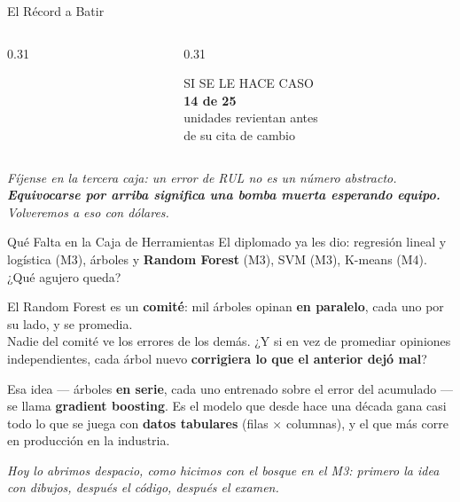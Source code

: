 \documentclass[aspectratio=169, 11pt]{beamer}
\begin{document}
\begin{frame}[shrink=8]{El Récord a Batir}
\begin{columns}[T]
\begin{column}{0.31\textwidth}
    \end{column}
    \begin{column}{0.31\textwidth}
      \begin{tcolorbox}[colback=arcaGray, colframe=codeBlue, boxrule=0pt, leftrule=3pt,
        arc=3pt, left=6pt, right=6pt, top=6pt, bottom=6pt]
        \centering
        {\scriptsize\color{textMuted}SI SE LE HACE CASO}\\[4pt]
        {\LARGE\color{codeBlue}\bfseries 14 de 25}\\[4pt]
        {\scriptsize\color{textMuted}unidades revientan antes\\de su cita de cambio}
      \end{tcolorbox}
    \end{column}
  \end{columns}
  \vspace{10pt}
  {\footnotesize\color{arcaDark}\itshape
   Fíjense en la tercera caja: un error de RUL no es un número
   abstracto. \textbf{Equivocarse por arriba significa una bomba muerta
   esperando equipo.} Volveremos a eso con dólares.}
\end{frame}

\begin{frame}[shrink=16]{Qué Falta en la Caja de Herramientas}
  \vspace{2pt}
  {\footnotesize\color{textMuted}
  El diplomado ya les dio: regresión lineal y logística (M3), árboles y
  \textbf{Random Forest} (M3), SVM (M3), K-means (M4). ¿Qué agujero
  queda?}
  \vspace{8pt}
  \begin{tcolorbox}[colback=arcaGray, colframe=arcaRed, boxrule=0pt,
    leftrule=4pt, arc=3pt, left=10pt, right=10pt, top=7pt, bottom=7pt]
    {\footnotesize\color{arcaDark}
     El Random Forest es un \textbf{comité}: mil árboles opinan
     \textbf{en paralelo}, cada uno por su lado, y se promedia.\\[6pt]
     Nadie del comité ve los errores de los demás. ¿Y si en vez de
     promediar opiniones independientes, cada árbol nuevo
     \textbf{corrigiera lo que el anterior dejó mal}?}
  \end{tcolorbox}
  \vspace{8pt}
  {\footnotesize\color{textMuted}
   Esa idea --- árboles \textbf{en serie}, cada uno entrenado sobre el
   error del acumulado --- se llama \textbf{gradient boosting}. Es el
   modelo que desde hace una década gana casi todo lo que se juega con
   \textbf{datos tabulares} (filas $\times$ columnas), y el que más corre
   en producción en la industria.}
  \vspace{6pt}

  {\scriptsize\color{arcaDark}\itshape
   Hoy lo abrimos despacio, como hicimos con el bosque en el M3: primero
   la idea con dibujos, después el código, después el examen.}
\end{frame}
\end{document}
